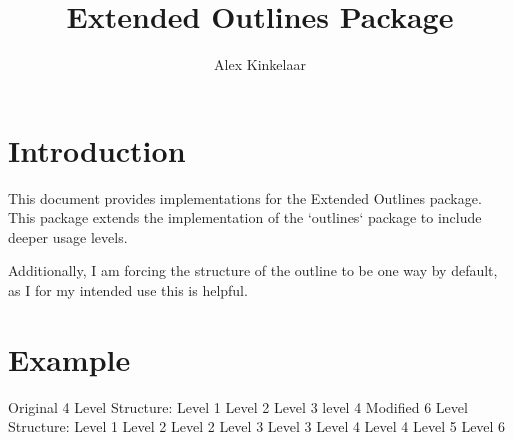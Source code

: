 \documentclass{article}
\title{Extended Outlines Package}
\author{Alex Kinkelaar}
\date{ }
\begin{document}
\maketitle

\section{Introduction}
This document provides implementations for the Extended Outlines package. This package extends the implementation of the `outlines` package to include deeper usage levels.

Additionally, I am forcing the structure of the outline to be one way by default, as I for my intended use this is helpful. 

\section{Example}
\begin{outline}
\0 Original 4 Level Structure:
\1 Level 1
\2 Level 2
\3 Level 3
\4 level 4
\0 Modified 6 Level Structure:
\1 Level 1
\2 Level 2
\2 Level 2
\3 Level 3
\3 Level 3
\4 Level 4
\4 Level 4
\5 Level 5
\6 Level 6
\end{outline}
\end{document}
